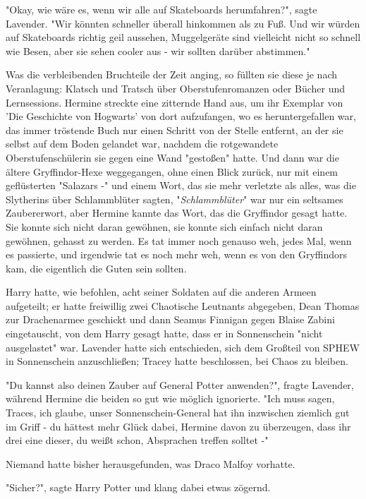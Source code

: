 {"Okay, wie wäre es, wenn wir alle auf Skateboards herumfahren?", sagte Lavender. "Wir könnten schneller überall hinkommen als zu Fuß. Und wir würden auf Skateboards richtig geil aussehen, Muggelgeräte sind vielleicht nicht so schnell wie Besen, aber sie sehen cooler aus - wir sollten darüber abstimmen."

Was die verbleibenden Bruchteile der Zeit anging, so füllten sie diese je nach Veranlagung: Klatsch und Tratsch über Oberstufenromanzen oder Bücher und Lernsessions. Hermine streckte eine zitternde Hand aus, um ihr Exemplar von 'Die Geschichte von Hogwarts' von dort aufzufangen, wo es heruntergefallen war, das immer tröstende Buch nur einen Schritt von der Stelle entfernt, an der sie selbst auf dem Boden gelandet war, nachdem die rotgewandete Oberstufenschülerin sie gegen eine Wand "gestoßen" hatte. Und dann war die ältere Gryffindor-Hexe weggegangen, ohne einen Blick zurück, nur mit einem geflüsterten "Salazars -" und einem Wort, das sie mehr verletzte als alles, was die Slytherins über Schlammblüter sagten, "\emph{Schlammblüter}" war nur ein seltsames Zaubererwort, aber Hermine kannte das Wort, das die Gryffindor gesagt hatte. Sie konnte sich nicht daran gewöhnen, sie konnte sich einfach nicht daran gewöhnen, gehasst zu werden. Es tat immer noch genauso weh, jedes Mal, wenn es passierte, und irgendwie tat es noch mehr weh, wenn es von den Gryffindors kam, die eigentlich die Guten sein sollten.

Harry hatte, wie befohlen, acht seiner Soldaten auf die anderen Armeen aufgeteilt; er hatte freiwillig zwei Chaotische Leutnants abgegeben, Dean Thomas zur Drachenarmee geschickt und dann Seamus Finnigan gegen Blaise Zabini eingetauscht, von dem Harry gesagt hatte, dass er in Sonnenschein "nicht ausgelastet" war. Lavender hatte sich entschieden, sich dem Großteil von SPHEW in Sonnenschein anzuschließen; Tracey hatte beschlossen, bei Chaos zu bleiben.

"Du kannst also deinen Zauber auf General Potter anwenden?", fragte Lavender, während Hermine die beiden so gut wie möglich ignorierte. "Ich muss sagen, Traces, ich glaube, unser Sonnenschein-General hat ihn inzwischen ziemlich gut im Griff - du hättest mehr Glück dabei, Hermine davon zu überzeugen, dass ihr drei eine dieser, du weißt schon, Absprachen treffen solltet -"

Niemand hatte bisher herausgefunden, was Draco Malfoy vorhatte.

"Sicher?", sagte Harry Potter und klang dabei etwas zögernd.

}
